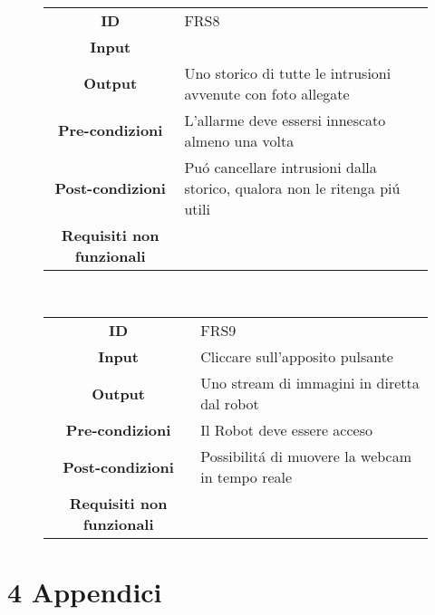 \documentclass[]{article}
\begin{document}
~

\begin{figure}[htbp]
\centering
\begin{tabular}{|c|l|}
\hline
\textbf{ID}
 & 
FRS8
\\
\textbf{Input}
 & 

\\
\textbf{Output}
 & 
Uno storico di tutte le intrusioni avvenute con foto allegate
\\
\textbf{Pre-condizioni}
 & 
L'allarme deve essersi innescato almeno una volta
\\
\textbf{Post-condizioni}
 & 
Puó cancellare intrusioni dalla storico, qualora non le ritenga piú
utili
\\
\textbf{Requisiti non funzionali}
 & 

\\
\hline
\end{tabular}
\end{figure}

~

\begin{figure}[htbp]
\centering
\begin{tabular}{|c|l|}
\hline
\textbf{ID} & FRS9\\
\textbf{Input} & Cliccare sull'apposito pulsante\\
\textbf{Output} & Uno stream di immagini in diretta dal
robot\\
\textbf{Pre-condizioni} & Il Robot deve essere acceso\\
\textbf{Post-condizioni} & Possibilitá di muovere la webcam in tempo
reale\\
\textbf{Requisiti non funzionali} &\\
\hline
\end{tabular}
\end{figure}

\hypertarget{appendici}{%
\section{4 Appendici}\label{appendici}}
\end{document}
